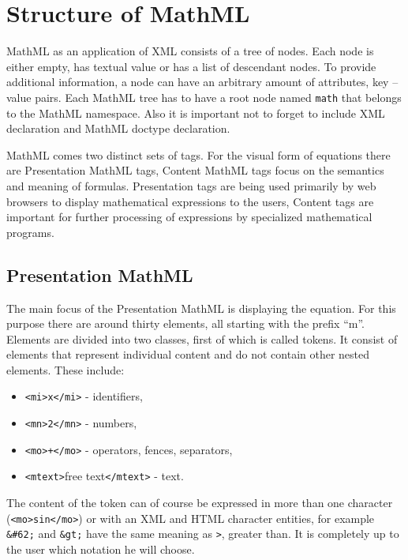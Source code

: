 \documentclass[11pt,oneside,final]{fithesis2}
\begin{document}
\section{Structure of MathML}
MathML as an application of XML consists of a tree of nodes. Each node is either empty, has textual value or has a list of descendant nodes. To provide additional information, a node can have an arbitrary amount of attributes, key – value pairs. Each MathML tree has to have a root node named \texttt{math} that belongs to the MathML namespace. Also it is important not to forget to include XML declaration and MathML doctype declaration. 

MathML comes two distinct sets of tags. For the visual form of equations there are Presentation MathML tags, Content MathML tags focus on the semantics and meaning of formulas. Presentation tags are being used primarily by web browsers to display mathematical expressions to the users, Content tags are important for further processing of expressions by specialized mathematical programs.

\subsection{Presentation MathML}
The main focus of the Presentation MathML is displaying the equation. For this purpose there are around thirty elements, all starting with the prefix “m”. Elements are divided into two classes, first of which is called tokens. It consist of elements that represent individual content and do not contain other nested elements. These include: 
\begin{itemize}
\item \texttt{<mi>x</mi>} - identifiers,
\item \texttt{<mn>2</mn>} - numbers,
\item \texttt{<mo>+</mo>} - operators, fences, separators,
\item \texttt{<mtext>}free text\texttt{</mtext>} - text.
\end{itemize}
The content of the token can of course be expressed in more than one character (\texttt{<mo>sin</mo>}) or with an XML and HTML character entities, for example \texttt{\&\#62;} and \texttt{\&gt;} have the same meaning as \texttt{>}, greater than. It is completely up to the user which notation he will choose.
\end{document}

